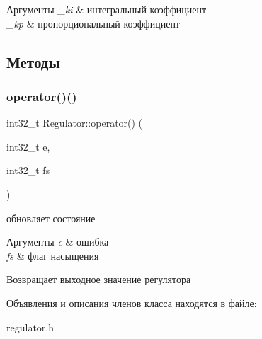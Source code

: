 \begin{DoxyParams}{Аргументы}
{\em \+\_\+ki} & интегральный коэффициент \\
\hline
{\em \+\_\+kp} & пропорциональный коэффициент \\
\hline
\end{DoxyParams}


\subsection{Методы}
\mbox{\label{classRegulator_a7b288e46cae0665700bf7ff4772c573c}} 
\subsubsection{\texorpdfstring{operator()()}{operator()()}}
{\footnotesize\ttfamily int32\+\_\+t Regulator\+::operator() (\begin{DoxyParamCaption}\item[{int32\+\_\+t}]{e,  }\item[{int32\+\_\+t}]{fs }\end{DoxyParamCaption})\hspace{0.3cm}{\ttfamily [inline]}}



обновляет состояние 


\begin{DoxyParams}{Аргументы}
{\em e} & ошибка \\
\hline
{\em fs} & флаг насыщения \\
\hline
\end{DoxyParams}
\begin{DoxyReturn}{Возвращает}
выходное значение регулятора 
\end{DoxyReturn}


Объявления и описания членов класса находятся в файле\+:\begin{DoxyCompactItemize}
\item 
regulator.\+h\end{DoxyCompactItemize}
